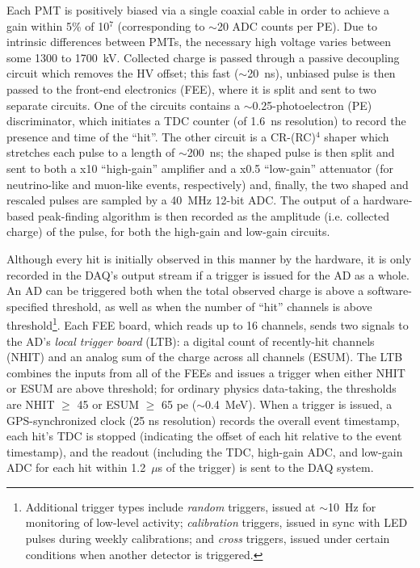 \documentclass[../thesis.tex]{subfiles}
\begin{document}
Each PMT is positively biased via a single coaxial cable in order to achieve a
gain within 5\% of 10$^7$ (corresponding to $\sim$20 ADC counts per PE). Due to
intrinsic differences between PMTs, the necessary high voltage varies between
some 1300 to 1700~kV. Collected charge is passed through a passive decoupling
circuit which removes the HV offset; this fast ($\sim$20~ns), unbiased pulse is
then passed to the front-end electronics (FEE), where it is split and sent to
two separate circuits. One of the circuits contains a $\sim$0.25-photoelectron
(PE) discriminator, which initiates a TDC counter (of 1.6~ns resolution) to
record the presence and time of the ``hit''. The other circuit is a CR-(RC)$^4$
shaper which stretches each pulse to a length of $\sim$200~ns; the shaped pulse
is then split and sent to both a x10 ``high-gain'' amplifier and a x0.5
``low-gain'' attenuator (for neutrino-like and muon-like events, respectively)
and, finally, the two shaped and rescaled pulses are sampled by a 40~MHz 12-bit
ADC. The output of a hardware-based peak-finding algorithm is then recorded as
the amplitude (i.e. collected charge) of the pulse, for both the high-gain and
low-gain circuits.

Although every hit is initially observed in this manner by the hardware, it is
only recorded in the DAQ's output stream if a trigger is issued for the AD as a
whole. An AD can be triggered both when the total observed charge is above a
software-specified threshold, as well as when the number of ``hit'' channels is
above threshold\footnote{Additional trigger types include \emph{random}
  triggers, issued at $\sim$10~Hz for monitoring of low-level activity;
  \emph{calibration} triggers, issued in sync with LED pulses during weekly
  calibrations; and \emph{cross} triggers, issued under certain conditions when
  another detector is triggered.}. Each FEE board, which reads up to 16
channels, sends two signals to the AD's \emph{local trigger board} (LTB): a
digital count of recently-hit channels (NHIT) and an analog sum of the charge
across all channels (ESUM). The LTB combines the inputs from all of the FEEs and
issues a trigger when either NHIT or ESUM are above threshold; for ordinary
physics data-taking, the thresholds are NHIT $\geq$ 45 or ESUM $\geq$ 65 pe
($\sim$0.4~MeV). When a trigger is issued, a GPS-synchronized clock (25 ns
resolution) records the overall event timestamp, each hit's TDC is stopped
(indicating the offset of each hit relative to the event timestamp), and the
readout (including the TDC, high-gain ADC, and low-gain ADC for each hit within
1.2~$\mu$s of the trigger) is sent to the DAQ system.
\end{document}
